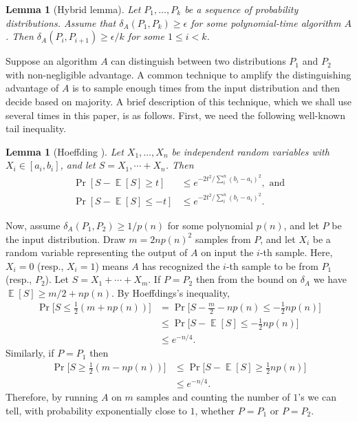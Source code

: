 \documentclass[11pt]{article}
\theoremstyle{plain}
\newtheorem{lemma}[theorem]{Lemma}
\theoremstyle{definition}
\DeclareMathOperator{\E}{\mathbb{E}}
\begin{document}
\begin{lemma}[Hybrid lemma]
    \label{lem:hybrid}
    Let $P_1, \dots, P_k$ be a sequence of probability distributions. Assume that $\delta_A(P_1, P_k) \ge \epsilon$ for some polynomial-time algorithm $A$. Then $\delta_A(P_i, P_{i + 1}) \ge \epsilon / k$ for some $1 \le i < k$.
\end{lemma}

Suppose an algorithm $A$ can distinguish between two distributions $P_1$ and $P_2$ with non-negligible advantage. A common technique to amplify the distinguishing advantage of $A$ is to sample enough times from the input distribution and then decide based on majority. A brief description of this technique, which we shall use several times in this paper, is as follows. First, we need the following well-known tail inequality.

\begin{lemma}[Hoeffding \cite{hoeffding1963probability}]
    \label{lem:hoeffding}
    Let $X_1, \dots, X_n$ be independent random variables with $X_i \in [a_i, b_i]$, and let $S = X_1, \cdots + X_n$. Then
    \begin{align*}
        \Pr[S - \E[S] \ge t] & \le e^{-2t^2 / \sum_i^n (b_i - a_i)^2}, \text{ and} \\
        \Pr[S - \E[S] \le -t] & \le e^{-2t^2 / \sum_i^n (b_i - a_i)^2}.
    \end{align*}
\end{lemma}

Now, assume $\delta_A(P_1, P_2) \ge 1 / p(n)$ for some polynomial $p(n)$, and let $P$ be the input distribution. Draw $m = 2np(n)^2$ samples from $P$, and let $X_i$ be a random variable representing the output of $A$ on input the $i$-th sample. Here, $X_i = 0$ (resp., $X_i = 1$) means $A$ has recognized the $i$-th sample to be from $P_1$ (resp., $P_2$). Let $S = X_1 + \cdots + X_m$. If $P = P_2$ then from the bound on $\delta_A$ we have $\E[S] \ge m / 2 + np(n)$. By Hoeffdings's inequality,
\begin{align*}
    \Pr\Big[ S \le \frac{1}{2} (m + np(n)) \Big]
    & = \Pr\Big[ S - \frac{m}{2} - np(n) \le -\frac{1}{2}np(n) \Big] \\
    & \le \Pr\Big[ S - \E[S] \le -\frac{1}{2}np(n) \Big] \\
    & \le e^{-n / 4}.
\end{align*}
Similarly, if $P = P_1$ then
\begin{align*}
    \Pr\Big[ S \ge \frac{1}{2} (m - np(n)) \Big]
    & \le \Pr\Big[ S - \E[S] \ge \frac{1}{2}np(n) \Big] \\
    & \le e^{-n / 4}.
\end{align*}
Therefore, by running $A$ on $m$ samples and counting the number of $1$'s we can tell, with probability exponentially close to $1$, whether $P = P_1$ or $P = P_2$.
\end{document}
